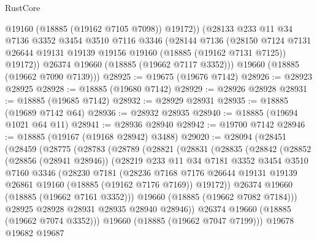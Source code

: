 \begin{lexlean}{RustCore}
\begin{coremodule}
          @19160
          (@18885 (@19162 @7105 @7098))
          @19172))
      (@28133
        @233
        @11
        @34
        @7136
        @3352
        @3454
        @3510
        @7116
        @3346
        (@28144
          @7136
          (@28150
            @7124
            @7131
            @26644
            @19131
            @19139
            @19156
            @19160
            (@18885 (@19162 @7131 @7125))
            @19172))
        @26374
        @19660
        (@18885 (@19662 @7117 @3352)))
      @19660
      (@18885 (@19662 @7090 @7139)))
@28925 := @19675 (@19676 @7142)
@28926 := @28923 @28925
@28928 := @18885 (@19680 @7142)
@28929 := @28926 @28928
@28931 := @18885 (@19685 @7142)
@28932 := @28929 @28931
@28935 := @18885 (@19689 @7142 @64)
@28936 := @28932 @28935
@28940 := @18885 (@19694 @1021 @64 @11)
@28941 := @28936 @28940
@28942 := @19700 @7142
@28946 := @18885 (@19167 (@19168 @28942) @3488)
@29020 := @28094
    (@28451
      (@28459
        (@28775
          (@28783
            (@28789
              (@28821
                (@28831
                  (@28835
                    (@28842
                      (@28852
                        (@28856 (@28941 @28946))
                        (@28219
                          @233
                          @11
                          @34
                          @7181
                          @3352
                          @3454
                          @3510
                          @7160
                          @3346
                          (@28230
                            @7181
                            (@28236
                              @7168
                              @7176
                              @26644
                              @19131
                              @19139
                              @26861
                              @19160
                              (@18885 (@19162 @7176 @7169))
                              @19172))
                          @26374
                          @19660
                          (@18885 (@19662 @7161 @3352)))
                        @19660
                        (@18885 (@19662 @7082 @7184)))
                      @28925
                      @28928
                      @28931
                      @28935
                      @28940
                      @28946))
                  @26374
                  @19660
                  (@18885 (@19662 @7074 @3352)))
                @19660
                (@18885 (@19662 @7047 @7199)))
              @19678
              @19682
              @19687

\end{coremodule}
\end{lexlean}
